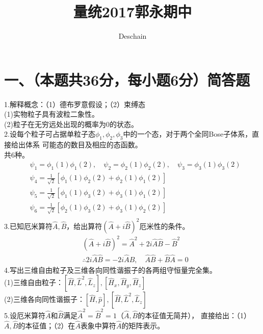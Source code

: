 \documentclass[UTF8]{ctexart}
\title{量统2017郭永期中}
\author{Deschain}
\begin{document}
\maketitle
\section*{一、（本题共36分，每小题6分）简答题}
1.解释概念：（1）德布罗意假设；（2）束缚态\\
(1)实物粒子具有波粒二象性。\\
(2)粒子在无穷远处出现的概率为0的状态。\\
2.设每个粒子可占据单粒子态$\phi_1,\phi_2,\phi_3$中的一个态，对于两个全同Bose子体系，直接给出体系
可能态的数目及相应的态函数。\\
共6种。
\begin{equation*}
  \begin{aligned}
     & \psi_1=\phi_1(1)\phi_1(2),\quad\psi_2=\phi_2(1)\phi_2(2),\quad\psi_3=\phi_3(1)\phi_3(2) \\
     & \psi_4=\frac{1}{\sqrt2}[\phi_1(1)\phi_2(2)+\phi_2(1)\phi_1(2)]                          \\
     & \psi_5=\frac{1}{\sqrt2}[\phi_1(1)\phi_3(2)+\phi_3(1)\phi_1(2)]                          \\
     & \psi_6=\frac{1}{\sqrt2}[\phi_2(1)\phi_3(2)+\phi_3(1)\phi_2(2)]                          \\
  \end{aligned}
\end{equation*}
3.已知厄米算符$\hat A,\hat B$，给出算符$(\hat A+i\hat B)^2$厄米性的条件。\\
\begin{equation*}
  \begin{aligned}
     & (\hat A+i\hat B)^2=\hat A^2+2i\hat A\hat B-\hat B^2                         \\
     & \therefore 2i\hat A\hat B=-2i\hat A\hat B,\quad \hat A\hat B+\hat B\hat A=0
  \end{aligned}
\end{equation*}
4.写出三维自由粒子及三维各向同性谐振子的各两组守恒量完全集。\\
(1)三维自由粒子：$[\hat H,\hat L^2,\hat L_z],[\hat H_x,\hat H_y,\hat H_z]$\\
(2)三维各向同性谐振子：$[\hat H,\hat p],[\hat H,\hat L^2,\hat L_z]$\\
5.设厄米算符$\hat A$和$\hat B$满足$\hat A^2=\hat B^2=1$（$\hat A,\hat B$的本征值无简并），
直接给出：（1）$\hat A,\hat B$的本征值；（2）在$\hat A$表象中算符$\hat A$的矩阵表示。\\
\end{document}
